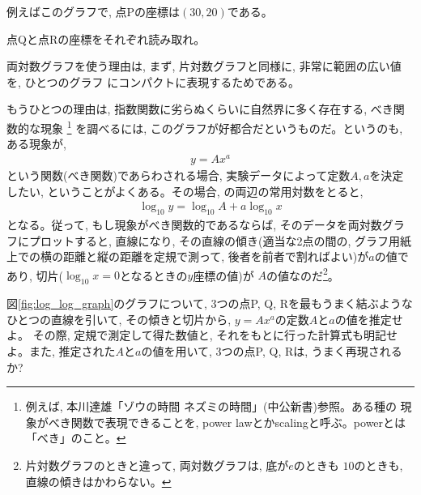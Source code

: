例えばこのグラフで, 点Pの座標は$(30, 20)$である。\mv

\begin{q}\label{q:exp_logloggraph0} 点Qと点Rの座標をそれぞれ読み取れ。\end{q}\mv


両対数グラフを使う理由は, まず, 片対数グラフと同様に, 非常に範囲の広い値を, ひとつのグラフ
にコンパクトに表現するためである。

もうひとつの理由は, 指数関数に劣らぬくらいに自然界に多く存在する, べき関数的な現象
\footnote{例えば, 本川達雄「ゾウの時間 ネズミの時間」(中公新書)参照。ある種の
現象がべき関数で表現できることを, power lawとかscalingと呼ぶ。powerとは「べき」のこと。}
を調べるには, このグラフが好都合だというものだ。というのも, ある現象が, 
\begin{eqnarray}
y=Ax^a\label{eq:exponential_power00}
\end{eqnarray}
という関数(べき関数)であらわされる場合, 実験データによって定数$A, a$を決定したい, 
ということがよくある。その場合, の両辺の常用対数をとると, 
\begin{eqnarray}
\log_{10} y=\log_{10} A + a \log_{10} x\label{eq:exponential_power02}
\end{eqnarray}
となる。従って, もし現象がべき関数的であるならば, そのデータを両対数グラフにプロットすると, 
直線になり, その直線の傾き(適当な2点の間の, グラフ用紙上での横の距離と縦の距離を定規で測って, 
後者を前者で割ればよい)が$a$の値であり, 切片($\log_{10} x=0$となるときの$y$座標の値)が
$A$の値なのだ\footnote{片対数グラフのときと違って, 両対数グラフは, 底が$e$のときも
$10$のときも, 直線の傾きはかわらない。}。\mv

\begin{q}\label{q:exp_logloggraph1} 図\ref{fig:log_log_graph}のグラフについて, 
3つの点P, Q, Rを最もうまく結ぶようなひとつの直線を引いて, 
その傾きと切片から, $y=Ax^a$の定数$A$と$a$の値を推定せよ。
その際, 定規で測定して得た数値と, それをもとに行った計算式も明記せよ。また, 
推定された$A$と$a$の値を用いて, 3つの点P, Q, Rは, うまく再現されるか?\end{q}
\mv





